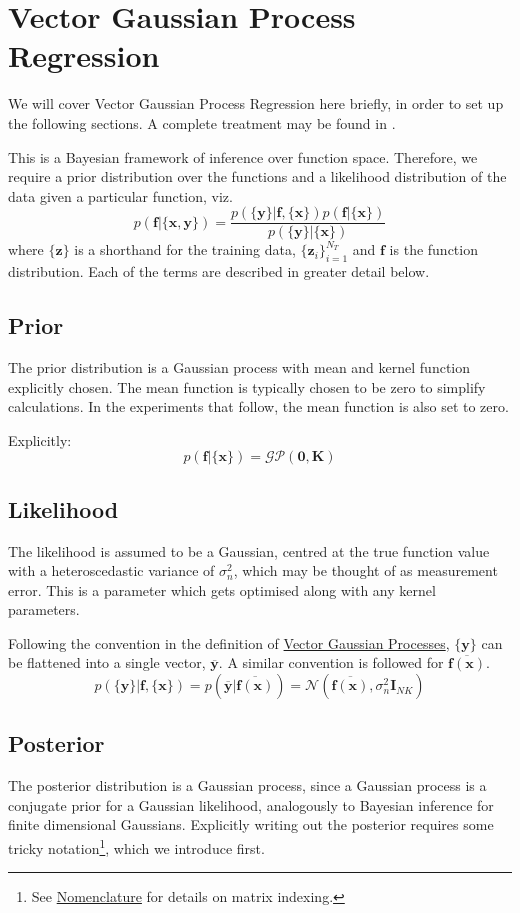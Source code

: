\documentclass[12pt,a4paper,twoside]{report}
\theoremstyle{definition}
\begin{document}
\section{Vector Gaussian Process Regression}
We will cover Vector Gaussian Process Regression here briefly, in order to set up the following sections. A complete treatment may be found in \cite{alvarez}.

This is a Bayesian framework of inference over function space. Therefore, we require a prior distribution over the functions and a likelihood distribution of the data given a particular function, viz.
$$p(\mathbf f|\{\mathbf x,\mathbf y\}) = \frac{p(\{\mathbf y\}|\mathbf f,\{\mathbf x\})p(\mathbf f|\{\mathbf x\})}{p(\{\mathbf y\}|\{\mathbf x\})}$$
where $\{\mathbf z\}$ is a shorthand for the training data, $\{\mathbf z_i\}_{i=1}^{N_T}$ and $\mathbf f$ is the function distribution. Each of the terms are described in greater detail below.

\subsection{Prior}\label{prior}
The prior distribution is a Gaussian process with mean and kernel function explicitly chosen. The mean function is typically chosen to be zero to simplify calculations. In the experiments that follow, the mean function is also set to zero.

Explicitly:
$$p(\mathbf f|\{\mathbf x\}) = \mathcal {GP}(\mathbf 0,\mathbf K)$$

\subsection{Likelihood}\label{likelihood}
The likelihood is assumed to be a Gaussian, centred at the true function value with a heteroscedastic variance of $\sigma_n^2$, which may be thought of as measurement error. This is a parameter which gets optimised along with any kernel parameters. 

Following the convention in the definition of \hyperref[vectorGP]{Vector Gaussian Processes}, $\{\mathbf y\}$ can be flattened into a single vector, $\mathbf{\overline y}$. A similar convention is followed for $\mathbf{\overline {f(\mathbf x)}}$.
$$ p(\{\mathbf y\}|\mathbf f, \{\mathbf x\}) = p\left(\mathbf{\overline y}| \mathbf{\overline {f(\mathbf x)}} \right) = \mathcal N(\mathbf{\overline {f(\mathbf x)}}, \sigma_n^2 \mathbf I_{NK}) $$

\subsection{Posterior}\label{posterior}
The posterior distribution is a Gaussian process, since a Gaussian process is a conjugate prior for a Gaussian likelihood, analogously to Bayesian inference for finite dimensional Gaussians. Explicitly writing out the posterior requires some tricky notation\footnote{See \hyperref[nomenclature]{Nomenclature} for details on matrix indexing.}, which we introduce first.
\end{document}
